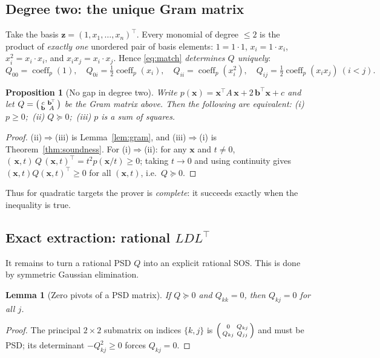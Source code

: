 \documentclass[11pt]{article}
\theoremstyle{definition}
\theoremstyle{plain}
\newtheorem{lemma}[definition]{Lemma}
\newtheorem{proposition}[definition]{Proposition}
\newcommand{\x}{\mathbf{x}}
\newcommand{\z}{\mathbf{z}}
\newcommand{\bb}{\mathbf{b}}
\newcommand{\psd}{\succeq 0}
\newcommand{\transpose}{^{\!\top}}
\DeclareMathOperator{\coeff}{coeff}
\begin{document}
\subsection{Degree two: the unique Gram matrix}
\label{sec:deg2}

Take the basis $\z = (1, x_1, \dots, x_n)\transpose$. Every monomial of degree
$\le 2$ is the product of \emph{exactly one} unordered pair of basis elements:
$1 = 1\cdot 1$, $x_i = 1\cdot x_i$, $x_i^2 = x_i\cdot x_i$, and $x_i x_j =
x_i\cdot x_j$. Hence \eqref{eq:match} \emph{determines $Q$ uniquely}:
\[
  Q_{00} = \coeff_p(1),\quad
  Q_{0i} = \tfrac12\coeff_p(x_i),\quad
  Q_{ii} = \coeff_p(x_i^2),\quad
  Q_{ij} = \tfrac12\coeff_p(x_i x_j)\ (i<j).
\]

\begin{proposition}[No gap in degree two]\label{prop:deg2}
Write $p(\x) = \x\transpose A\, \x + 2\,\bb\transpose \x + c$ and let
$Q = \begin{psmallmatrix} c & \bb\transpose \\ \bb & A \end{psmallmatrix}$ be the
Gram matrix above. Then the following are equivalent:
\textup{(i)} $p \ge 0$;\ \textup{(ii)} $Q \psd$;\ \textup{(iii)} $p$ is a sum of
squares.
\end{proposition}
\begin{proof}
(ii)$\Rightarrow$(iii) is Lemma~\ref{lem:gram}, and (iii)$\Rightarrow$(i) is
Theorem~\ref{thm:soundness}. For (i)$\Rightarrow$(ii): for any $\x$ and $t \ne
0$, $(\,\x, t)\, Q\, (\x,t)\transpose = t^2 p(\x/t) \ge 0$; taking $t \to 0$ and
using continuity gives $(\x,t)Q(\x,t)\transpose \ge 0$ for all $(\x,t)$, i.e.\
$Q \psd$.
\end{proof}

Thus for quadratic targets the prover is \emph{complete}: it succeeds exactly
when the inequality is true.

\subsection{Exact extraction: rational $LDL^{\top}$}

It remains to turn a rational PSD $Q$ into an explicit rational SOS. This is done
by symmetric Gaussian elimination.

\begin{lemma}[Zero pivots of a PSD matrix]\label{lem:zeropivot}
If $Q \psd$ and $Q_{kk} = 0$, then $Q_{kj} = 0$ for all $j$.
\end{lemma}
\begin{proof}
The principal $2\times 2$ submatrix on indices $\{k,j\}$ is
$\begin{psmallmatrix} 0 & Q_{kj} \\ Q_{kj} & Q_{jj}\end{psmallmatrix}$ and must be
PSD; its determinant $-Q_{kj}^2 \ge 0$ forces $Q_{kj} = 0$.
\end{proof}
\end{document}

